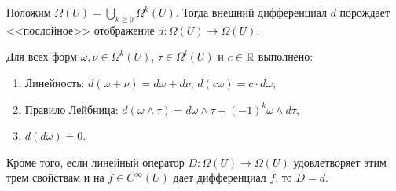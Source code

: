 \begin{note}
	Положим $\Omega(U) = \bigcup_{k \geq 0} \Omega^k(U)$. Тогда внешний дифференциал $d$ порождает <<послойное>> отображение $d : \Omega(U) \to \Omega(U)$. 
\end{note}

\begin{lemma}
	Для всех форм $\omega, \nu \in \Omega^k(U)$, $\tau \in \Omega^l(U)$ и $c \in \mathbb{R}$ выполнено:
	\begin{enumerate}[itemsep = 0pt, topsep =5pt]
		\item Линейность: $d(\omega + \nu) = d \omega + d \nu$, $d(c \omega) = c \cdot d \omega$,
		\item Правило Лейбница: $d(\omega \wedge \tau) = d \omega \wedge \tau + (-1)^k \omega \wedge d \tau$, 
		\item $d(d \omega) = 0$.
	\end{enumerate}
	Кроме того, если линейный оператор $D : \Omega(U) \to \Omega(U)$ удовлетворяет этим трем свойствам и на $f \in C^{\infty}(U)$ дает дифференциал $f$, то $D = d$.
\end{lemma}

